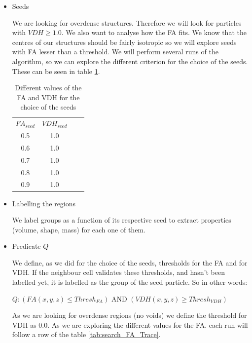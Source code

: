 \documentclass[12pt]{article}
\begin{document}
\begin{itemize}
    \item Seeds
\begin{par}
We are looking for overdense structures. Therefore we will look
for particles with $VDH \geq 1.0$.  We also want to analyse how
the FA fits. We know that the centres of our structures should be
fairly isotropic so we will explore seeds with FA lesser than a
threshold. We will perform several runs of the algorithm, so we
can explore the different criterion for the choice of the seeds.
These can be seen in table \ref{tab:seeds_FA_Trace}. 
\end{par}
 \begin{table}[ht]
    \centering
    \begin{tabular}{|c|c|c|c|}
        $FA_{seed}$ & $VDH_{seed}$ \\
        0.5 &  1.0 \\
        0.6 &  1.0 \\
        0.7 &  1.0 \\
        0.8 &  1.0 \\
        0.9 &  1.0 \\
    \end{tabular}
    \caption{Different values of the FA and VDH for the choice of the seeds}
    \label{tab:seeds_FA_Trace}
\end{table}
\FloatBarrier

\item Labelling the regions
\begin{par}
We label groups as a function of its respective
 seed to extract properties (volume, shape, mass)
  for each one of them.
\end{par}

\item Predicate $Q$

\begin{par}
We define, as we did for the
choice of the seeds, thresholds for the FA and for VDH. If
the neighbour cell validates these thresholds, and hasn't been
labelled yet, it is labelled as the group of the seed particle. So
in other words: \\

\begin{center}
$Q: \left( FA (x,y,z) \leq Thresh_{FA} \right)$ AND
$\left( VDH (x,y,z) \geq Thresh_{VDH} \right)$ 
\end{center}
As we are looking for overdense regions (no voids) we define the
threshold for VDH as 0.0. As we are exploring the different
values for the FA. each run will follow a row of the table \ref{tab:search_FA_Trace}.
\end{par}


\end{itemize}
\end{document}

